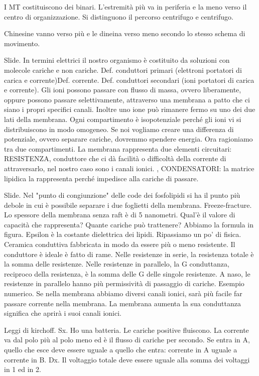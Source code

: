 \documentclass[a4paper,12pt]{article}
\begin{document}
I MT costituiscono dei binari. L'estremità più va in periferia e la meno verso il centro di organizzazione. Si distinguono il percorso centrifugo e centrifugo.

Chinesine vanno verso più e le dineina verso meno secondo lo stesso schema di movimento.

Slide.
In termini elettrici il nostro organismo è costituito da soluzioni con molecole cariche e non cariche. 
Def. conduttori primari (elettroni portatori di carica e corrente)Def. corrente. Def. conduttori secondari (ioni portatori di carica e corrente).
Gli ioni possono passare con flusso di massa, ovvero liberamente, oppure possono passare selettivamente, attraverso una membrana a patto che ci siano i propri specifici canali. Inoltre uno ione può rimanere fermo su uno dei due lati della membrana.
Ogni compartimento è isopotenziale perché gli ioni vi si distribuiscono in modo omogeneo. Se noi vogliamo creare una differenza di potenziale, ovvero separare cariche, dovremmo spendere energia.
Ora ragioniamo tra due compartimenti. La membrana rappresenta due elementi circuitari: RESISTENZA, conduttore che ci dà facilità o difficoltà della corrente di attraversarlo, nel nostro caso sono i canali ionici. , CONDENSATORI: la matrice lipidica la rappresenta perché impedisce alla cariche di passare.

Slide.
Nel "punto di congiunzione" delle code dei fosfolipidi si ha il punto più debole in cui è possibile separare i due foglietti della membrana. Freeze-fracture. 
Lo spessore della membrana senza raft è di 5 nanometri. Qual'è il valore di capacità che rappresenta? Quante cariche può trattenere? Abbiamo la formula in figura. Epsilon è la costante dielettrica dei lipidi.
Ripassiamo un po' di fisica. Ceramica conduttiva fabbricata in modo da essere più o meno resistente. Il conduttore è ideale è fatto di rame.
 Nelle resistenze in serie, la resistenza totale è la somma delle resistenze.
 Nelle resistenze in parallelo, la G conduttanza, reciproco della resistenza, è la somma delle G delle singole resistenze.
 A naso, le resistenze in parallelo hanno più permissività di passaggio di cariche.
Esempio numerico.
Se nella membrana abbiamo diversi canali ionici, sarà più facile far passare corrente nella membrana. La membrana aumenta la sua conduttanza significa che aprirà i suoi canali ionici.

Leggi di kirchoff. 
Sx. Ho una batteria. Le cariche positive fluiscono. La corrente va dal polo più al polo meno ed è il flusso di cariche per secondo. Se entra in A, quello che esce deve essere uguale a quello che entra: corrente in A uguale a corrente in B.
Dx. Il voltaggio totale deve essere uguale alla somma dei voltaggi in 1 ed in 2.
\end{document}
